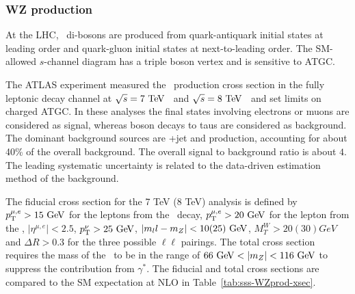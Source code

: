 \subsubsection{WZ production}

\label{sss-WZprod}

At the LHC, \WZ\ di-bosons are produced from quark-antiquark initial states at 
leading order and quark-gluon initial states at next-to-leading order. %
The SM-allowed $s$-channel diagram has a triple boson vertex and is sensitive to 
ATGC.





The ATLAS experiment measured the \WZ\ production cross section in the fully 
leptonic decay channel \ll\lnu\; at $\rts = 7\TeV$~\cite{Aad:2012twa} and $\rts = 8\TeV$~\cite{Aad:2016ett} 
and set limits on charged ATGC.
In these analyses the final states involving electrons or muons are considered as signal,
whereas boson decays to taus are considered as background.  
The dominant background sources are \Zboson+jet and \ZZ production, accounting for about 40\% of 
the overall background. The overall signal to background ratio is about $4$.
The leading systematic uncertainty is related to the data-driven estimation method of the   
background.%

The fiducial cross section for the 7 TeV (8 TeV) analysis is defined by $\pt^{\mu,e} > 15\GeV$ for the leptons from the \Zboson\ 
 decay, $\pt^{\mu,e} > 20\GeV$ for the lepton from the \Wboson, $|\eta^{\mu,e}|<2.5$, $\pt^\nu>25\GeV$,
 $|m_ll-m_Z| < 10(25)\GeV$, $M_T^W>20(30)GeV$ and $\Delta R> 0.3$ for the three possible $\ell\ell$ pairings. 
The total cross section requires the mass of the \Zboson\ to be in the range of $66\GeV < |m_Z| < 116\GeV$
to suppress the contribution from $\gamma^*$.
The fiducial and total cross sections are compared to the SM expectation at NLO in Table~\ref{tab:sss-WZprod-xsec}.

